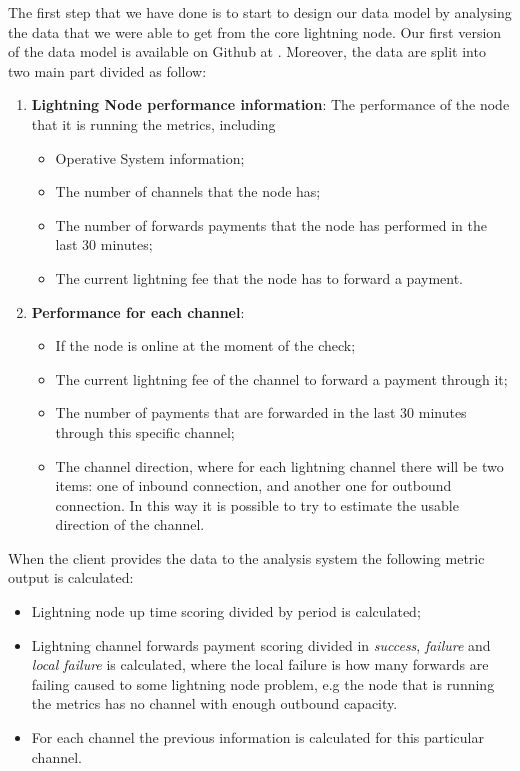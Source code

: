 The first step that we have done is to start to design our data model by analysing
the data that we were able to get from the core lightning node. Our first version
of the data model is available on Github at \cite{lnmetrics_localreputation}. 
Moreover, the data are split into two main part divided as follow:

\begin{enumerate}
    \item {\bf Lightning Node performance information}: The performance of the node that it is running
        the metrics, including
        \begin{itemize}
           \item Operative System information;
           \item The number of channels that the node has;
           \item The number of forwards payments that the node has performed in the 
               last 30 minutes;
           \item The current lightning fee that the node has to 
               forward a payment.
        \end{itemize}
    \item {\bf Performance for each channel}:
    \begin{itemize}
        \item If the node is online at the moment of the check;
        \item The current lightning fee of the channel to forward a payment through it;
        \item The number of payments that are forwarded in the last 30 minutes through this specific 
            channel;
        \item The channel direction, where for each lightning channel there will be two items: one of 
            inbound connection, and another one for outbound connection. In this way it is possible to 
            try to estimate the usable direction of the channel.
    \end{itemize}
\end{enumerate}

When the client provides the data to the analysis system the following metric output is calculated:

\begin{itemize}
    \item Lightning node up time scoring divided by period is calculated;
    \item Lightning channel forwards payment scoring divided in \emph{success}, \emph{failure} and \emph{local failure}
        is calculated, where the local failure is how many forwards are failing caused to some lightning node problem,
        e.g the node that is running the metrics has no channel with enough outbound capacity. 
    \item For each channel the previous information is calculated for this particular channel.
\end{itemize}

